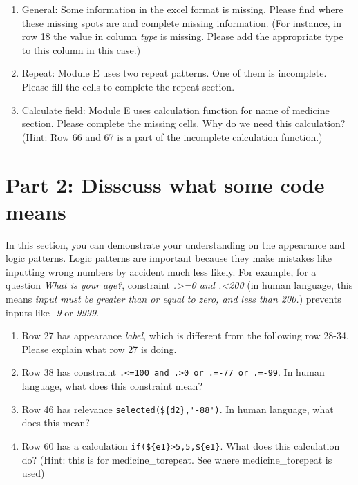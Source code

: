 \documentclass{tufte-handout}
\begin{document}
\begin{enumerate}
	\item General: Some information in the excel format is missing. Please find where these missing spots are and complete missing information. (For instance, in row 18 the value in column \textit{type} is missing. Please add the appropriate type to this column in this case.) 
	\item Repeat: Module E uses two repeat patterns. One of them is incomplete. Please fill the cells to complete the repeat section.
	\item Calculate field: Module E uses calculation function for name of medicine section. Please complete the missing cells. Why do we need this calculation? (Hint: Row 66 and 67 is a part of the incomplete calculation function.)
\end{enumerate}

\section{Part 2: Disscuss what some code means}
In this section, you can demonstrate your understanding on the appearance and logic patterns. Logic patterns are important because they make mistakes like inputting wrong numbers by accident much less likely. For example, for a question \textit{What is your age?}, constraint \textit{.>=0 and .<200} (in human language, this means \textit{input must be greater than or equal to zero, and less than 200.}) prevents inputs like \textit{-9} or \textit{9999}. 

\begin{enumerate}
	\item Row 27 has appearance \textit{label}, which is different from the following row 28-34. Please explain what row 27 is doing.
	\item Row 38 has constraint \verb|.<=100 and .>0 or .=-77 or .=-99|. In human language, what does this constraint mean?
	\item Row 46 has relevance  \verb|selected(${d2},'-88')|. In human language, what does this mean? 
	\item Row 60 has a calculation  \verb|if(${e1}>5,5,${e1}|. What does this calculation do? (Hint: this is for medicine\_torepeat. See where medicine\_torepeat is used)
\end{enumerate}
\end{document}
